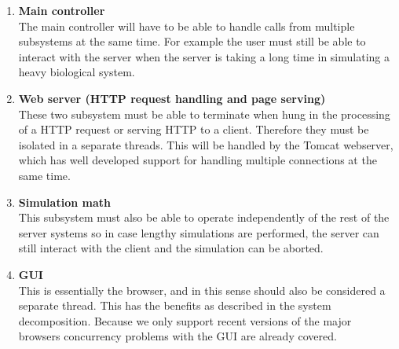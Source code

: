 \begin{enumerate}
\item \textbf{Main controller} \\
The main controller will have to be able to handle calls from multiple subsystems at the same time. For example the user must still be able to interact with the server when the server is taking a long time in simulating a heavy biological system.
\item \textbf{Web server (HTTP request handling and page serving)} \\
These two subsystem must be able to terminate when hung in the processing of a HTTP request or serving HTTP to a client. Therefore they must be isolated in a separate threads. This will be handled by the Tomcat webserver, which has well developed support for handling multiple connections at the same time. 
\item \textbf{Simulation math} \\
This subsystem must also be able to operate independently of the rest of the server systems so in case lengthy simulations are performed, the server can still interact with the client and the simulation can be aborted.
\item \textbf{GUI} \\
This is essentially the browser, and in this sense should also be considered a separate thread. This has the benefits as described in the system decomposition. Because we only support recent versions of the major browsers concurrency problems with the GUI are already covered.
\end{enumerate}
